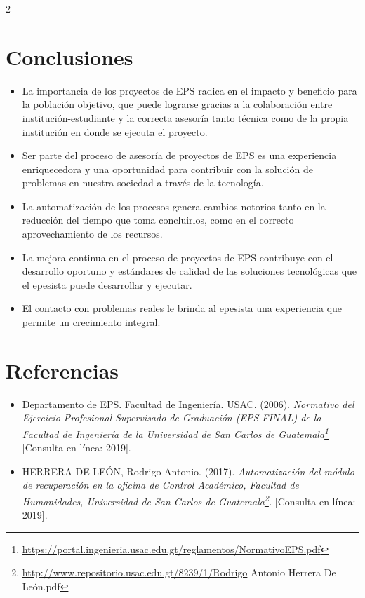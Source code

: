 \documentclass[11pt,spanish,Letterpaper,openany]{book}
\let\rmarkdownfootnote\footnote%
\def\footnote{\protect\rmarkdownfootnote}
\begin{document}
\begin {multicols}{2}

\hypertarget{conclusiones}{%
\section{Conclusiones}\label{conclusiones}}

\begin{itemize}
\item
  La importancia de los proyectos de EPS radica en el impacto y beneficio para la población objetivo, que puede lograrse gracias a la colaboración entre institución-estudiante y la correcta asesoría tanto técnica como de la propia institución en donde se ejecuta el proyecto.
\item
  Ser parte del proceso de asesoría de proyectos de EPS es una experiencia enriquecedora y una oportunidad para contribuir con la solución de problemas en nuestra sociedad a través de la tecnología.
\item
  La automatización de los procesos genera cambios notorios tanto en la reducción del tiempo que toma concluirlos, como en el correcto aprovechamiento de los recursos.
\item
  La mejora continua en el proceso de proyectos de EPS contribuye con el desarrollo oportuno y estándares de calidad de las soluciones tecnológicas que el epesista puede desarrollar y ejecutar.
\item
  El contacto con problemas reales le brinda al epesista una experiencia que permite un crecimiento integral.
\end{itemize}

\hypertarget{referencias}{%
\section{Referencias}\label{referencias}}

\begin{itemize}
\item
  Departamento de EPS. Facultad de Ingeniería. USAC. (2006). \emph{Normativo del Ejercicio Profesional Supervisado de Graduación (EPS FINAL) de la Facultad de Ingeniería de la Universidad de San Carlos de Guatemala\footnote{\url{https://portal.ingenieria.usac.edu.gt/reglamentos/NormativoEPS.pdf}}} {[}Consulta en línea: 2019{]}.
\item
  HERRERA DE LEÓN, Rodrigo Antonio. (2017). \emph{Automatización del módulo de recuperación en la oficina de Control Académico, Facultad de Humanidades, Universidad de San Carlos de Guatemala\footnote{\url{http://www.repositorio.usac.edu.gt/8239/1/Rodrigo} Antonio Herrera De León.pdf}.} {[}Consulta en línea: 2019{]}.
\end{itemize}

\end {multicols}
\end{document}
